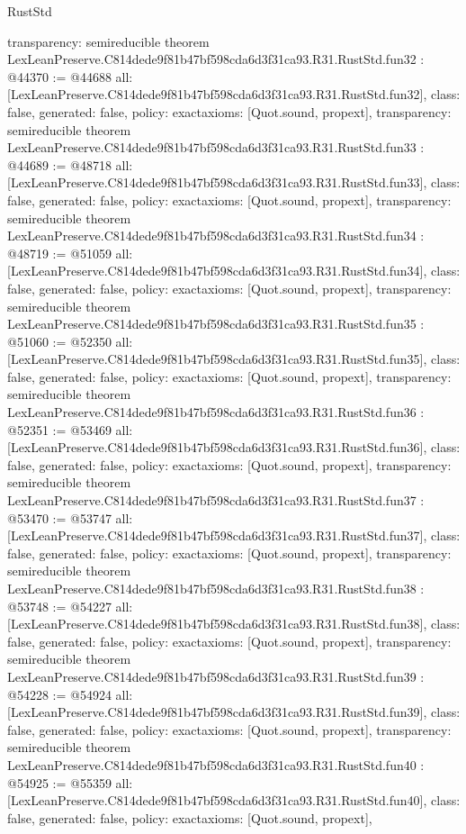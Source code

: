 \begin{lexlean}{RustStd}
\begin{coremodule}
{  transparency: semireducible
}
theorem LexLeanPreserve.C814dede9f81b47bf598cda6d3f31ca93.R31.RustStd.fun32 : @44370 := @44688 {
  all: [LexLeanPreserve.C814dede9f81b47bf598cda6d3f31ca93.R31.RustStd.fun32],
  class: false,
  generated: false,
  policy: exact{axioms: [Quot.sound, propext]},
  transparency: semireducible
}
theorem LexLeanPreserve.C814dede9f81b47bf598cda6d3f31ca93.R31.RustStd.fun33 : @44689 := @48718 {
  all: [LexLeanPreserve.C814dede9f81b47bf598cda6d3f31ca93.R31.RustStd.fun33],
  class: false,
  generated: false,
  policy: exact{axioms: [Quot.sound, propext]},
  transparency: semireducible
}
theorem LexLeanPreserve.C814dede9f81b47bf598cda6d3f31ca93.R31.RustStd.fun34 : @48719 := @51059 {
  all: [LexLeanPreserve.C814dede9f81b47bf598cda6d3f31ca93.R31.RustStd.fun34],
  class: false,
  generated: false,
  policy: exact{axioms: [Quot.sound, propext]},
  transparency: semireducible
}
theorem LexLeanPreserve.C814dede9f81b47bf598cda6d3f31ca93.R31.RustStd.fun35 : @51060 := @52350 {
  all: [LexLeanPreserve.C814dede9f81b47bf598cda6d3f31ca93.R31.RustStd.fun35],
  class: false,
  generated: false,
  policy: exact{axioms: [Quot.sound, propext]},
  transparency: semireducible
}
theorem LexLeanPreserve.C814dede9f81b47bf598cda6d3f31ca93.R31.RustStd.fun36 : @52351 := @53469 {
  all: [LexLeanPreserve.C814dede9f81b47bf598cda6d3f31ca93.R31.RustStd.fun36],
  class: false,
  generated: false,
  policy: exact{axioms: [Quot.sound, propext]},
  transparency: semireducible
}
theorem LexLeanPreserve.C814dede9f81b47bf598cda6d3f31ca93.R31.RustStd.fun37 : @53470 := @53747 {
  all: [LexLeanPreserve.C814dede9f81b47bf598cda6d3f31ca93.R31.RustStd.fun37],
  class: false,
  generated: false,
  policy: exact{axioms: [Quot.sound, propext]},
  transparency: semireducible
}
theorem LexLeanPreserve.C814dede9f81b47bf598cda6d3f31ca93.R31.RustStd.fun38 : @53748 := @54227 {
  all: [LexLeanPreserve.C814dede9f81b47bf598cda6d3f31ca93.R31.RustStd.fun38],
  class: false,
  generated: false,
  policy: exact{axioms: [Quot.sound, propext]},
  transparency: semireducible
}
theorem LexLeanPreserve.C814dede9f81b47bf598cda6d3f31ca93.R31.RustStd.fun39 : @54228 := @54924 {
  all: [LexLeanPreserve.C814dede9f81b47bf598cda6d3f31ca93.R31.RustStd.fun39],
  class: false,
  generated: false,
  policy: exact{axioms: [Quot.sound, propext]},
  transparency: semireducible
}
theorem LexLeanPreserve.C814dede9f81b47bf598cda6d3f31ca93.R31.RustStd.fun40 : @54925 := @55359 {
  all: [LexLeanPreserve.C814dede9f81b47bf598cda6d3f31ca93.R31.RustStd.fun40],
  class: false,
  generated: false,
  policy: exact{axioms: [Quot.sound, propext]},
}
\end{coremodule}
\end{lexlean}
